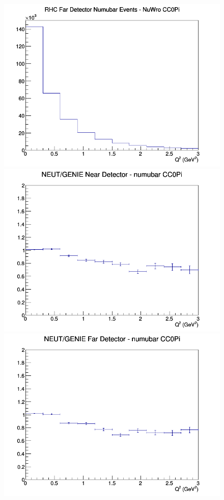 \begin{figure}[h]
\endminipage
{}
\includegraphics[width=\linewidth]{eff_Q2/LAr/CC0Pi_RHC_FD_numubar_Q2_NuWro.png}
\endminipage
\newline
{}
\includegraphics[width=\linewidth]{eff_Q2/LAr/ratios/CC0Pi_NEUT_GENIE_numubar_near_Q2.png}
\endminipage
{}
\includegraphics[width=\linewidth]{eff_Q2/LAr/ratios/CC0Pi_NEUT_GENIE_numubar_far_Q2.png}

\end{figure}
